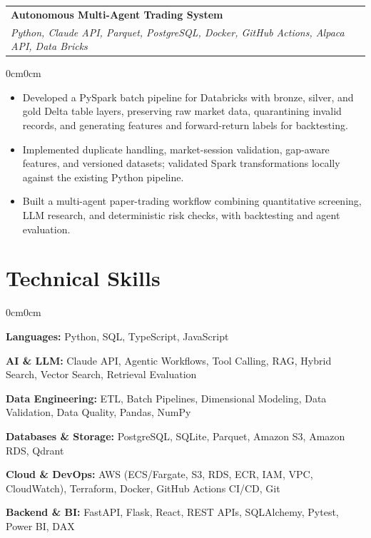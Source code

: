 \documentclass[10pt,letterpaper]{article}
\newenvironment{highlights}{
  \begin{itemize}[
    topsep=0.015cm,
    parsep=0cm,
    partopsep=0pt,
    itemsep=0.01cm,
    leftmargin=12pt
  ]
}{
  \end{itemize}
}
\newenvironment{onecolentry}{
  \begin{adjustwidth}{0cm}{0cm}
}{
  \end{adjustwidth}
}
\begin{document}
\vspace{0.04cm}
 
\begin{tabularx}{\textwidth}{Xr}
  \textbf{Autonomous Multi-Agent Trading System}\\[1pt]
  \textit{Python, Claude API, Parquet, PostgreSQL, Docker, GitHub Actions, Alpaca API, Data Bricks} & \\
\end{tabularx}
 
\begin{onecolentry}
\begin{highlights}
  \item Developed a PySpark batch pipeline for Databricks with bronze, silver, and gold Delta table layers, preserving raw market data, quarantining invalid records, and generating features and forward-return labels for backtesting.
  \item Implemented duplicate handling, market-session validation, gap-aware features, and versioned datasets; validated Spark transformations locally against the existing Python pipeline.
  \item Built a multi-agent paper-trading workflow combining quantitative screening, LLM research, and deterministic risk checks, with backtesting and agent evaluation.
\end{highlights}
\end{onecolentry}
 
\section{Technical Skills}
 
\begin{onecolentry}
  \textbf{Languages:} Python, SQL, TypeScript, JavaScript
 
  \vspace{1pt}
  \textbf{AI \& LLM:} Claude API, Agentic Workflows, Tool Calling, RAG, Hybrid Search, Vector Search, Retrieval Evaluation
 
  \vspace{1pt}
  \textbf{Data Engineering:} ETL, Batch Pipelines, Dimensional Modeling, Data Validation, Data Quality, Pandas, NumPy
 
  \vspace{1pt}
  \textbf{Databases \& Storage:} PostgreSQL, SQLite, Parquet, Amazon S3, Amazon RDS, Qdrant
 
  \vspace{1pt}
  \textbf{Cloud \& DevOps:} AWS (ECS/Fargate, S3, RDS, ECR, IAM, VPC, CloudWatch), Terraform, Docker, GitHub Actions CI/CD, Git
 
  \vspace{1pt}
  \textbf{Backend \& BI:} FastAPI, Flask, React, REST APIs, SQLAlchemy, Pytest, Power BI, DAX
\end{onecolentry}
 
\end{document}
